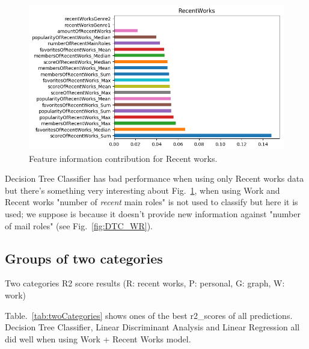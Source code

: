 \begin{figure}[!hbt]
	\centering
	\includegraphics[width=\columnwidth]{graphics/RecentWorks_DTC_featureImportances.png}
	\caption{Feature information contribution for Recent works.}
	\label{fig:DTC_R}
\end{figure}

Decision Tree Classifier has bad performance when using only Recent works data but there's something very interesting about Fig.~\ref{fig:DTC_R}, when using Work and Recent works "number of \textit{recent} main roles" is not used to classify but here it is used; we suppose is because it doesn't provide new information against "number of mail roles" (see Fig.~\ref{fig:DTC_WR}).

\FloatBarrier
\subsection{Groups of two categories}
\begin{table}[!hbt]
	\begin{center}
	\caption{Two categories R2 score results (R: recent works, P: personal, G: graph, W: work)}
	\label{tab:twoCategories}
	
	\end{center}
\end{table}

Table.~\ref{tab:twoCategories} shows ones of the best r2\_scores of all predictions. Decision Tree Classifier, Linear Discriminant Analysis and Linear Regression all did well when using Work + Recent Works model.

